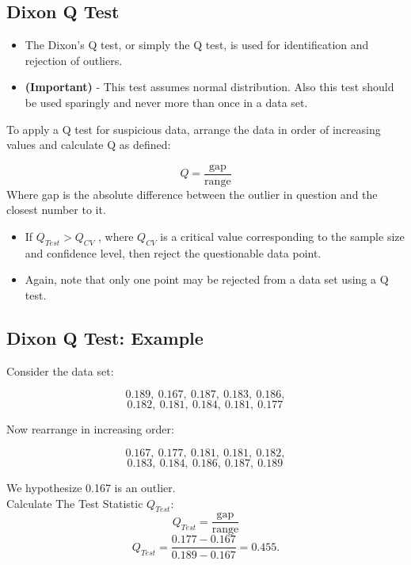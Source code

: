 \documentclass[a4paper,12pt]{article}
\begin{document}
\large 

\subsection{Dixon Q Test}
\begin{itemize}
	\item The Dixon's Q test, or simply the Q test, is used for identification and rejection of outliers. 
	\item \textbf{(Important)} - This test assumes normal distribution. Also this test should be used sparingly and never more than once in a data set. 
\end{itemize}

To apply a Q test for suspicious data, arrange the data in order of increasing values and calculate Q as defined:

\[ Q = \frac{\text{gap}}{\text{range}} \]
Where gap is the absolute difference between the outlier in question and the closest number to it. 

\begin{itemize}
	\item 	If $Q_{Test} > Q_{CV}$ , where $Q_{CV}$ is a critical value corresponding to the sample size and confidence level, then reject the questionable data point. 
	\item Again, note that only one point may be rejected from a data set using a Q test.
\end{itemize}


\subsection{Dixon Q Test: Example}
Consider the data set:
\begin{framed}
	\[0.189,\ 0.167,\ 0.187,\ 0.183,\ 0.186,\]\[ 0.182,\ 0.181,\ 0.184,\ 0.181,\ 0.177 \,\]
\end{framed}
Now rearrange in increasing order:
\begin{framed}
	\[0.167,\ 0.177,\ 0.181,\ 0.181,\ 0.182,\]\[ 0.183,\ 0.184,\ 0.186,\ 0.187,\ 0.189 \, \]
\end{framed}

We hypothesize 0.167 is an outlier. \\ Calculate The Test Statistic $Q_{Test}$:
{
	\[ Q_{Test}=\frac{\text{gap}}{\text{range}}  \]
	\[ Q_{Test} 
	= \frac{0.177-0.167}{0.189-0.167}=0.455.\]
}
\end{document}

